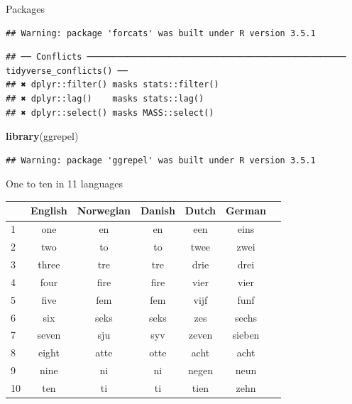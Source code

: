 \documentclass[ignorenonframetext,]{beamer}
\newenvironment{Shaded}{\begin{snugshade}}{\end{snugshade}}
\newcommand{\KeywordTok}[1]{\textcolor[rgb]{0.13,0.29,0.53}{\textbf{#1}}}
\newcommand{\NormalTok}[1]{#1}
\begin{document}
\begin{frame}[fragile]{Packages}
\begin{verbatim}
## Warning: package 'forcats' was built under R version 3.5.1
\end{verbatim}

\begin{verbatim}
## ── Conflicts ─────────────────────────────────────────────────── tidyverse_conflicts() ──
## ✖ dplyr::filter() masks stats::filter()
## ✖ dplyr::lag()    masks stats::lag()
## ✖ dplyr::select() masks MASS::select()
\end{verbatim}

\begin{Shaded}
\begin{Highlighting}[]
\KeywordTok{library}\NormalTok{(ggrepel)}
\end{Highlighting}
\end{Shaded}

\begin{verbatim}
## Warning: package 'ggrepel' was built under R version 3.5.1
\end{verbatim}

\end{frame}

\begin{frame}{One to ten in 11 languages}
\protect\hypertarget{one-to-ten-in-11-languages}{}

\begin{tabular}{lcccccc}
& English & Norwegian & Danish & Dutch & German\\
\hline
1 & one & en & en & een & eins\\
2 & two & to & to & twee & zwei\\
3 & three & tre & tre & drie & drei\\
4 & four & fire & fire & vier & vier\\
5 & five & fem & fem & vijf & funf\\
6 & six & seks & seks & zes & sechs\\
7 & seven & sju & syv & zeven & sieben\\
8 & eight & atte & otte & acht & acht\\
9 & nine & ni & ni & negen & neun\\
10 & ten & ti & ti & tien & zehn\\
\hline
\end{tabular}

\end{frame}
\end{document}
